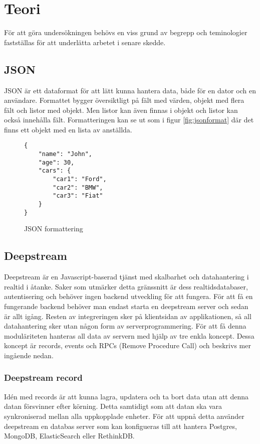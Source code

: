 \section{Teori}

\label{sec:tim-theory}
För att göra undersökningen behövs en viss grund av begrepp och teminologier fastställas för att underlätta arbetet i senare skedde.

\subsection{JSON}
JSON\cite{json} är ett dataformat för att lätt kunna hantera data, både för en dator och en användare. Formattet bygger översiktligt på fält med värden, objekt med flera fält och listor med objekt. Men listor kan även finnas i objekt och listor kan också innehålla fält. Formatteringen kan se ut som i figur \ref{fig:jsonformat} där det finns ett objekt med en lista av anställda.

\lstset{language=Java}
\begin{figure}[h]
  \begin{minipage}[c]{5cm}
    \begin{lstlisting}
{
    "name": "John",
    "age": 30,
    "cars": {
        "car1": "Ford",
        "car2": "BMW",
        "car3": "Fiat"
    }
} 
    \end{lstlisting}
  \caption{JSON formattering}
  \label{fig:tim-jsonformat}
  \end{minipage}
\end{figure}

\subsection{Deepstream}
\label{subsec:tim-deepstream}
Deepstream är en Javascript-baserad tjänst med skalbarhet och datahantering i realtid i åtanke. Saker som utmärker detta gränssnitt är dess realtidsdatabaser, autentisering och behöver ingen backend utveckling för att fungera. För att få en fungerande backend behöver man endast starta en deepstream server och sedan är allt igång. Resten av integreringen sker på klientsidan av applikationen, så all datahantering sker utan någon form av serverprogrammering. För att få denna moduläriteten hanteras all data av servern med hjälp av tre enkla koncept. Dessa koncept är records, events och RPCs (Remove Procedure Call) och beskrivs mer ingående nedan. 

\subsubsection{Deepstream record}
Idén med records är att kunna lagra, updatera och ta bort data utan att denna datan försvinner efter körning. Detta samtidigt som att datan ska vara synkroniserad mellan alla uppkopplade enheter. För att uppnå detta använder deepstream en databas server som kan konfigueras till att hantera Postgres, MongoDB, ElasticSearch eller RethinkDB. 

